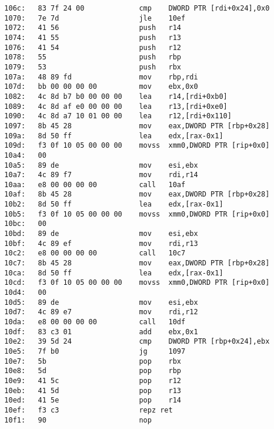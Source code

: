 {}
\begin{lstlisting}
  106c:   83 7f 24 00             cmp    DWORD PTR [rdi+0x24],0x0
  1070:   7e 7d                   jle    10ef
  1072:   41 56                   push   r14
  1074:   41 55                   push   r13
  1076:   41 54                   push   r12
  1078:   55                      push   rbp
  1079:   53                      push   rbx
  107a:   48 89 fd                mov    rbp,rdi
  107d:   bb 00 00 00 00          mov    ebx,0x0
  1082:   4c 8d b7 b0 00 00 00    lea    r14,[rdi+0xb0]
  1089:   4c 8d af e0 00 00 00    lea    r13,[rdi+0xe0]
  1090:   4c 8d a7 10 01 00 00    lea    r12,[rdi+0x110]
  1097:   8b 45 28                mov    eax,DWORD PTR [rbp+0x28]
  109a:   8d 50 ff                lea    edx,[rax-0x1]
  109d:   f3 0f 10 05 00 00 00    movss  xmm0,DWORD PTR [rip+0x0]
  10a4:   00 
  10a5:   89 de                   mov    esi,ebx
  10a7:   4c 89 f7                mov    rdi,r14
  10aa:   e8 00 00 00 00          call   10af
  10af:   8b 45 28                mov    eax,DWORD PTR [rbp+0x28]
  10b2:   8d 50 ff                lea    edx,[rax-0x1]
  10b5:   f3 0f 10 05 00 00 00    movss  xmm0,DWORD PTR [rip+0x0] 
  10bc:   00 
  10bd:   89 de                   mov    esi,ebx
  10bf:   4c 89 ef                mov    rdi,r13
  10c2:   e8 00 00 00 00          call   10c7
  10c7:   8b 45 28                mov    eax,DWORD PTR [rbp+0x28]
  10ca:   8d 50 ff                lea    edx,[rax-0x1]
  10cd:   f3 0f 10 05 00 00 00    movss  xmm0,DWORD PTR [rip+0x0]
  10d4:   00 
  10d5:   89 de                   mov    esi,ebx
  10d7:   4c 89 e7                mov    rdi,r12
  10da:   e8 00 00 00 00          call   10df
  10df:   83 c3 01                add    ebx,0x1
  10e2:   39 5d 24                cmp    DWORD PTR [rbp+0x24],ebx
  10e5:   7f b0                   jg     1097
  10e7:   5b                      pop    rbx
  10e8:   5d                      pop    rbp
  10e9:   41 5c                   pop    r12
  10eb:   41 5d                   pop    r13
  10ed:   41 5e                   pop    r14
  10ef:   f3 c3                   repz ret 
  10f1:   90                      nop
\end{lstlisting}


~\\

